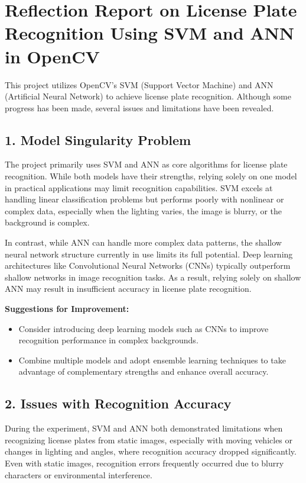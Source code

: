 \documentclass{article}
\begin{document}
	
	\section*{Reflection Report on License Plate Recognition Using SVM and ANN in OpenCV}
	
	This project utilizes OpenCV's SVM (Support Vector Machine) and ANN (Artificial Neural Network) to achieve license plate recognition. Although some progress has been made, several issues and limitations have been revealed.
	
	\subsection*{1. Model Singularity Problem}
	
	The project primarily uses SVM and ANN as core algorithms for license plate recognition. While both models have their strengths, relying solely on one model in practical applications may limit recognition capabilities. SVM excels at handling linear classification problems but performs poorly with nonlinear or complex data, especially when the lighting varies, the image is blurry, or the background is complex.
	
	In contrast, while ANN can handle more complex data patterns, the shallow neural network structure currently in use limits its full potential. Deep learning architectures like Convolutional Neural Networks (CNNs) typically outperform shallow networks in image recognition tasks. As a result, relying solely on shallow ANN may result in insufficient accuracy in license plate recognition.
	
	\textbf{Suggestions for Improvement:}
	\begin{itemize}
		\item Consider introducing deep learning models such as CNNs to improve recognition performance in complex backgrounds.
		\item Combine multiple models and adopt ensemble learning techniques to take advantage of complementary strengths and enhance overall accuracy.
	\end{itemize}
	
	\subsection*{2. Issues with Recognition Accuracy}
	
	During the experiment, SVM and ANN both demonstrated limitations when recognizing license plates from static images, especially with moving vehicles or changes in lighting and angles, where recognition accuracy dropped significantly. Even with static images, recognition errors frequently occurred due to blurry characters or environmental interference.
	
\end{document}
